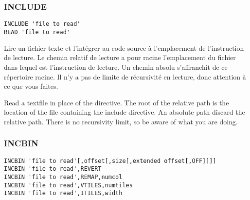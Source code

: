 
\section{}

\subsection{}


\subsubsection{INCLUDE}

\begin{verbatim}
INCLUDE 'file to read'
READ 'file to read'
\end{verbatim}


\begin{xfr}
Lire un fichier texte et l'intégrer au code source à l'emplacement de l'instruction de lecture. Le chemin relatif de lecture a pour racine l'emplacement du fichier dans lequel est l'instruction de lecture. Un chemin absolu s'affranchit de ce répertoire racine.
Il n'y a pas de limite de récursivité en lecture, donc attention à ce que vous faites.
\end{xfr}

\begin{xen}
Read a textfile in place of the directive. The root of the relative path is the location of the file containing the include directive. An absolute path discard the relative path.
There is no recursivity limit, so be aware of what you are doing.
\end{xen}

\subsubsection{INCBIN}

\begin{verbatim}
INCBIN 'file to read'[,offset[,size[,extended offset[,OFF]]]]
INCBIN 'file to read',REVERT
INCBIN 'file to read',REMAP,numcol
INCBIN 'file to read',VTILES,numtiles
INCBIN 'file to read',ITILES,width
\end{verbatim}

